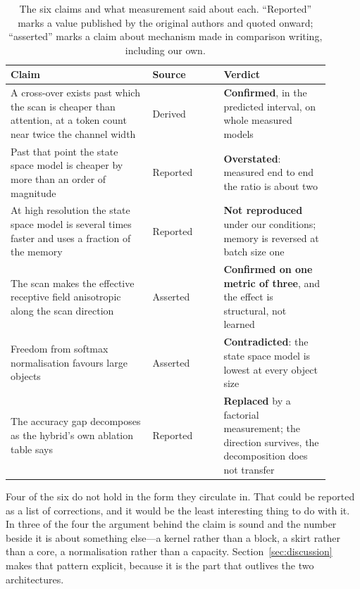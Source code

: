 \begin{table}[tbp]
  \centering
  \caption{The six claims and what measurement said about each. ``Reported''
  marks a value published by the original authors and quoted onward;
  ``asserted'' marks a claim about mechanism made in comparison writing,
  including our own.}
  \label{tab:verdicts}
  \small
  \begin{tabular}{@{}p{0.4\linewidth}p{0.2\linewidth}p{0.3\linewidth}@{}}
    \toprule
    Claim & Source & Verdict \tabularnewline
    \midrule
    A cross-over exists past which the scan is cheaper than attention, at a
      token count near twice the channel width
      & Derived & \textbf{Confirmed}, in the predicted interval, on whole
      measured models \tabularnewline
    Past that point the state space model is cheaper by more than an order
      of magnitude
      & Reported & \textbf{Overstated}: measured end to end the ratio is
      about two \tabularnewline
    At high resolution the state space model is several times faster and uses
      a fraction of the memory
      & Reported & \textbf{Not reproduced} under our conditions; memory is
      reversed at batch size one \tabularnewline
    The scan makes the effective receptive field anisotropic along the scan
      direction
      & Asserted & \textbf{Confirmed on one metric of three}, and the effect
      is structural, not learned \tabularnewline
    Freedom from softmax normalisation favours large objects
      & Asserted & \textbf{Contradicted}: the state space model is lowest at
      every object size \tabularnewline
    The accuracy gap decomposes as the hybrid's own ablation table says
      & Reported & \textbf{Replaced} by a factorial measurement; the
      direction survives, the decomposition does not transfer \tabularnewline
    \bottomrule
  \end{tabular}
\end{table}

Four of the six do not hold in the form they circulate in. That could be
reported as a list of corrections, and it would be the least interesting
thing to do with it. In three of the four the argument behind the claim is
sound and the number beside it is about something else---a kernel rather than
a block, a skirt rather than a core, a normalisation rather than a capacity.
Section~\ref{sec:discussion} makes that pattern explicit, because it is the
part that outlives the two architectures.

